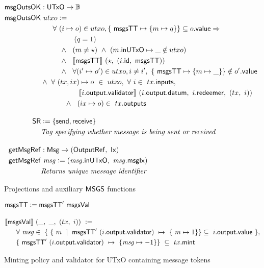 \begin{figure}
  \begin{align*}
    \fun{msgOutsOK}& : \UTxO \to \B \\
    \fun{msgOutsOK}&~utxo \leteq~\\
    &~~~~~\forall~(i\mapsto o) \in utxo,
    \{~\msgsTT \mapsto \{ m \mapsto q \}\} \subseteq o.\val \Rightarrow\\
    &~~~~~~~~~~~~~~(q = 1) ~~\\
    &~~~~~~~~\wedge~~(m \neq \emptytype)~\wedge~(m.\fun{inUTxO} \mapsto \_ \notin utxo) ~~ \\
    &~~~~~~~~\wedge~~\applyMPScript{\msgsTT}~(\emptytype,~(i.\txrefid,~\msgsTT)) \\
    &~~~~~~~~\wedge~~\forall (i'\mapsto o') \in utxo, i\neq i',~\{~\msgsTT \mapsto \{ m \mapsto \_ \}\} \notin o'.\val \\
    &\wedge~\forall ~(tx, ix) \mapsto o~\in~utxo,~\forall ~i\in~tx.\inputs, \\
    &~~~~~~~~~~~~~~~~\applyScript{i.\fun{output}.\fun{validator}}~(i.\fun{output}.\datum,~i.\redeemer,~(tx,~i))~~ \\
    &~~~~~~~~~~\wedge~~(ix \mapsto o)\in~tx.\outputs
    \nextdef
    \SR &\leteq \{\send, \receive\} \\
    & \text{\emph{Tag specifying whether message is being sent or received}}
    \nextdef
    \fun{getMsgRef}& : \Msg \to (\OutputRef,~\Ix) \\
    \fun{getMsgRef}& ~\var{msg} \leteq (\var{msg}.\fun{inUTxO},~\var{msg}.\fun{msgIx}) \\
    & \text{\emph{Returns unique message identifier}}
  \end{align*}
\caption{Projections and auxiliary $\mathsf{MSGS}$ functions}
\label{fig:msgs-aux}
\end{figure}
%
\begin{figure}
  \begin{align*}
    & \msgsTT \leteq \msgsTT'~\msgsVal
    \nextdef
    &\applyScript{\msgsVal}~(\_,~\_,~(tx,~i))~\leteq \\
    &~~~~~\forall~\var{msg} \in~\{~\{~m~\mid~\msgsTT'~(i.\fun{output}.\validator)~ \mapsto ~\{~m \mapsto 1 \} \} \subseteq ~i.\fun{output}.\val~\}, \\
    &~~~~~ \{~\msgsTT'~(i.\fun{output}.\validator)~ \mapsto ~\{ \var{msg} \mapsto -1 \} \} ~\subseteq~tx.\mint
  \end{align*}
\caption{Minting policy and validator for UTxO containing message tokens}
\label{fig:msgs-codeV}
\end{figure}
